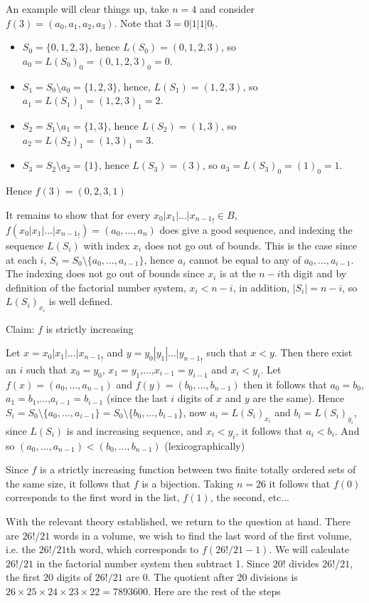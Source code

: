 \documentclass[11pt]{article}
\begin{document}
An example will clear things up, take $n=4$ and consider $f(3)=(a_0,a_1,a_2,a_3)$. Note that
$3=0|1|1|0_!$.
\begin{itemize}
	\item $S_0=\{0,1,2,3\}$, hence $L(S_0)=(0,1,2,3)$, so $a_0=L(S_0)_0=(0,1,2,3)_0=0$.
	\item $S_1=S_0\setminus{a_0}=\{1,2,3\}$, hence, $L(S_1)=(1,2,3)$, so $a_1=L(S_1)_1=(1,2,3)_1=2$.
	\item $S_2=S_1\setminus{a_1}=\{1,3\}$, hence $L(S_2)=(1,3)$, so $a_2=L(S_2)_1=(1,3)_1=3$.
	\item $S_3=S_2\setminus{a_2}=\{1\}$, hence $L(S_3)=(3)$, so $a_3=L(S_3)_0=(1)_0=1$.
\end{itemize}
Hence $f(3)=(0,2,3,1)$

It remains to show that for every $x_0|x_1|...|{x_{n-1}}_!\in B$, $f(x_0|x_1|...|{x_{n-1}}_!)=(a_0,...,a_n)$ does give a good sequence, and indexing the sequence $L(S_i)$ with index $x_i$ does not go out of bounds. This is the case since at each $i$, $S_i=S_0\setminus\{a_0,...,a_{i-1}\}$, hence $a_i$ cannot be equal to any of $a_0,...,a_{i-1}$. The indexing does not go out of bounds since $x_i$ is at the $n-i$th digit and by definition of the factorial number system, $x_i<n-i$, in addition, $|S_i|=n-i$, so $L(S_i)_{x_i}$ is well defined.

Claim: $f$ is strictly increasing

Let $x=x_0|x_1|...|{x_{n-1}}_!$ and $y=y_0|y_1|...|{y_{n-1}}_!$ such that $x<y$. Then there exist an $i$ such that $x_0=y_0$, $x_1=y_1$,...,$x_{i-1}=y_{i-1}$ and $x_i<y_i$. Let $f(x)=(a_0,...,a_{n-1})$ and $f(y)=(b_0,...,b_{n-1})$ then it follows that $a_0=b_0$, $a_1=b_1$,...,$a_{i-1}=b_{i-1}$ (since the last $i$ digits of $x$ and $y$ are the same). Hence $S_i=S_0\setminus\{a_0,...,a_{i-1}\}=S_0\setminus\{b_0,...,b_{i-1}\}$, now $a_i=L(S_i)_{x_i}$ and $b_i=L(S_i)_{y_i}$, since $L(S_i)$ is and increasing sequence, and $x_i<y_i$, it follows that $a_i<b_i$. And so $(a_0,...,a_{n-1})<(b_0,...,b_{n-1})$ (lexicographically)

Since $f$ is a strictly increasing function between two finite totally ordered sets of the same size, it follows that $f$ is a bijection. Taking $n=26$ it follows that $f(0)$ corresponds to the first word in the list, $f(1)$, the second, etc...

With the relevant theory established, we return to the question at hand. There are $26!/21$ words in a volume, we wish to find the last word of the first volume, i.e. the $26!/21$th word, which corresponds to $f(26!/21-1)$. We will calculate $26!/21$ in the factorial number system then subtract 1. Since $20!$ divides $26!/21$, the first $20$ digits of $26!/21$ are $0$. The quotient after $20$ divisions is $26\times25\times24\times23\times22=7893600$. Here are the rest of the steps
\end{document}
